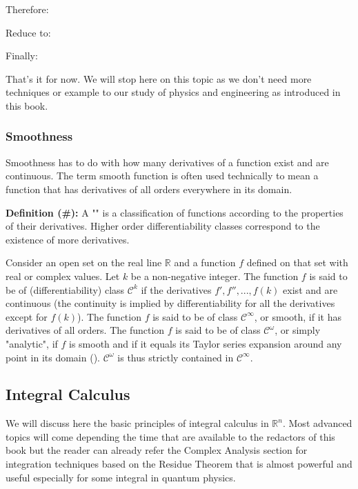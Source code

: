 	Therefore:
	
	Reduce to:
	
	Finally:
	
	That's it for now. We will stop here on this topic as we don't need more techniques or example to our study of physics and engineering as introduced in this book.
	
		\pagebreak
		\subsubsection{Smoothness}\label{smoothness}
		 Smoothness has to do with how many derivatives of a function exist and are continuous. The term smooth function is often used technically to mean a function that has derivatives of all orders everywhere in its domain.
		 
		 \textbf{Definition  (\#\mydef):} A "" is a classification of functions according to the properties of their derivatives. Higher order differentiability classes correspond to the existence of more derivatives.
		 
		 Consider an open set on the real line $\mathbb{R}$ and a function $f$ defined on that set with real or complex values. Let $k$ be a non-negative integer. The function $f$ is said to be of (differentiability) class $\mathcal{C}^k$ if the derivatives $f', f'', ..., f(k)$ exist and are continuous (the continuity is implied by differentiability for all the derivatives except for $f(k)$). The function $f$ is said to be of class $\mathcal{C}^\infty$, or smooth, if it has derivatives of all orders. The function $f$ is said to be of class $\mathcal{C}^\omega$, or simply "analytic", if $f$ is smooth and if it equals its Taylor series expansion around any point in its domain (). $\mathcal{C}^\omega$ is thus strictly contained in $\mathcal{C}^\infty$.

		\pagebreak
		 \subsection{Integral Calculus}\label{integral calculus}
		 We will discuss here the basic principles of integral calculus in $\mathbb{R}^n$. Most advanced topics will come depending the time that are available to the redactors of this book but the reader can already refer the Complex Analysis section for integration techniques based on the Residue Theorem that is almost powerful and useful especially for some integral in quantum physics.
		 
